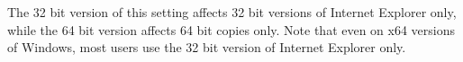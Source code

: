 The 32 bit version of this setting affects 32 bit versions of Internet Explorer
only, while the 64 bit version affects 64 bit copies only. Note that even on x64
versions of Windows, most users use the 32 bit version of Internet Explorer
only.